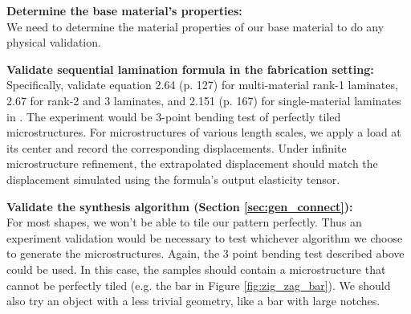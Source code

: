 \begin{description}
\item{\bf Determine the base material's properties:}\\
We need to determine the material properties of our base material to do any
physical validation.

\item{\bf Validate sequential lamination formula in the fabrication setting:}\\
Specifically, validate equation 2.64 (p. 127) for multi-material rank-1 laminates, 2.67 for
rank-2 and 3 laminates, and 2.151 (p. 167) for single-material laminates in
\cite{allaire2002shape}.  The experiment would be 3-point bending test of
perfectly tiled microstructures. For microstructures of various length scales, we
apply a load at its center and record the corresponding displacements.  Under
infinite microstructure refinement, the extrapolated displacement should match
the displacement simulated using the formula's output elasticity tensor.

\item{\bf Validate the synthesis algorithm (Section \ref{sec:gen_connect}):}\\
For most shapes, we won't be able to tile our pattern perfectly.  Thus an
experiment validation would be necessary to test whichever algorithm we choose to
generate the microstructures.  Again, the 3 point bending test described above could
be used.  In this case, the samples should contain a microstructure that cannot
be perfectly tiled (e.g. the bar in Figure \ref{fig:zig_zag_bar}). We should
also try an object with a less trivial geometry, like a bar with large notches.

\end{description}

